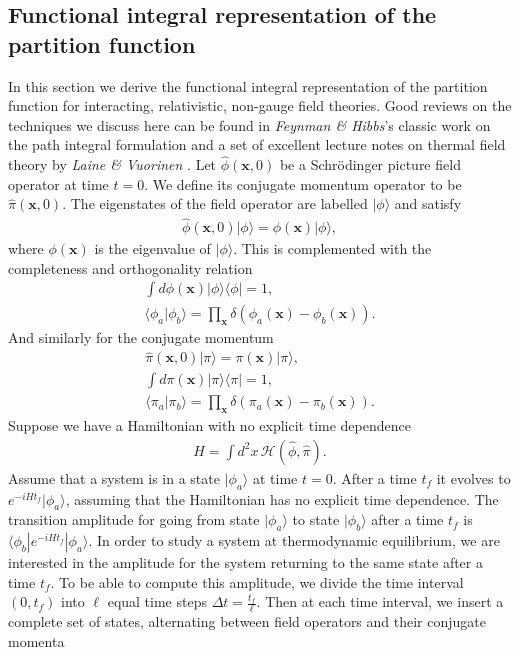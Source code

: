         \subsection{Functional integral representation of the partition function} \label{Functional_Integral_sec}
        In this section we derive the functional integral representation of the partition function for interacting, relativistic, non-gauge field theories. Good reviews on the techniques we discuss here can be found in \textit{Feynman \& Hibbs}'s classic work on the path integral formulation \cite{0486477223} and a set of excellent lecture notes on thermal field theory by \textit{Laine \& Vuorinen} \cite{Laine:2016hma}.
        Let $\hat{\phi}(\bm{x},0)$ be a Schrödinger picture field operator at time $t=0$. We define its conjugate momentum operator to be $\hat{\pi}(\bm{x},0)$. The eigenstates of the field operator are labelled $| \phi \rangle$ and satisfy
        \begin{align}
            \hat{\phi}(\bm{x},0) | \phi \rangle = \phi(\bm{x}) | \phi \rangle,
        \end{align}
        where $\phi(\bm{x})$ is the eigenvalue of $| \phi \rangle$. This is complemented with the completeness and orthogonality relation
        \begin{align}
            \int d \phi(\bm{x}) | \phi \rangle \langle \phi | = 1, \\
            \langle \phi_a | \phi_b \rangle = \prod_{\bm{x}} \delta(\phi_a(\bm{x}) - \phi_b(\bm{x})).
        \end{align}
        And similarly for the conjugate momentum
        \begin{align}
            \hat{\pi}(\bm{x},0) | \pi \rangle = \pi(\bm{x}) | \pi \rangle, \\
            \int d \pi(\bm{x}) | \pi \rangle \langle \pi | = 1, \\
            \langle \pi_a | \pi_b \rangle = \prod_{\bm{x}} \delta(\pi_a(\bm{x}) - \pi_b(\bm{x})).
        \end{align}
        Suppose we have a Hamiltonian with no explicit time dependence
        \begin{align}
            H = \int d^2x \, \mathcal{H}(\hat{\phi}, \hat{\pi}).
        \end{align}
        Assume that a system is in a state $| \phi_a \rangle$ at time $t=0$. After a time $t_f$ it evolves to $e^{-i H t_f} | \phi_a \rangle$, assuming that the Hamiltonian has no explicit time dependence. The transition amplitude for going from state $| \phi_a \rangle$ to state $| \phi_b \rangle$ after a time $t_f$ is $\langle \phi_b | e^{-i H t_f} | \phi_a \rangle$. In order to study a system at thermodynamic equilibrium, we are interested in the amplitude for the system returning to the same state after a time $t_f$. To be able to compute this amplitude, we divide the time interval $(0, t_f)$ into $\ell$ equal time steps $\Delta t = \frac{t_f}{\ell}$. Then at each time interval, we insert a complete set of states, alternating between field operators and their conjugate momenta
